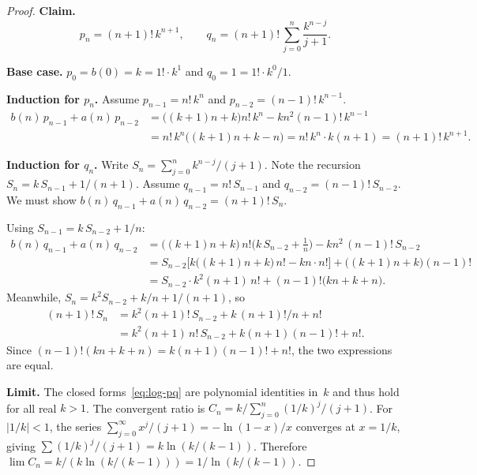 \documentclass[11pt,a4paper]{article}
\theoremstyle{plain}
\theoremstyle{remark}
\begin{document}
\begin{proof}
\textbf{Claim.}
\begin{equation}\label{eq:log-pq}
  p_n = (n{+}1)!\, k^{n+1}, \qquad
  q_n = (n{+}1)!\, \sum_{j=0}^{n} \frac{k^{n-j}}{j+1}.
\end{equation}

\textbf{Base case.}
$p_0 = b(0) = k = 1!\cdot k^1$ and $q_0 = 1 = 1!\cdot k^0/1$.

\medskip\noindent\textbf{Induction for $p_n$.}
Assume $p_{n-1} = n!\,k^n$ and $p_{n-2} = (n{-}1)!\,k^{n-1}$.
\begin{align*}
  b(n)\,p_{n-1} + a(n)\,p_{n-2}
  &= \bigl((k{+}1)n + k\bigr) n!\,k^n - kn^2 (n{-}1)!\,k^{n-1} \\
  &= n!\,k^n\bigl((k{+}1)n + k - n\bigr)
   = n!\,k^n \cdot k(n{+}1) = (n{+}1)!\,k^{n+1}.
\end{align*}

\medskip\noindent\textbf{Induction for $q_n$.}
Write $S_n = \sum_{j=0}^{n} k^{n-j}/(j{+}1)$.
Note the recursion $S_n = k\,S_{n-1} + 1/(n{+}1)$.
Assume $q_{n-1} = n!\,S_{n-1}$ and $q_{n-2} = (n{-}1)!\,S_{n-2}$.
We must show $b(n)\,q_{n-1} + a(n)\,q_{n-2} = (n{+}1)!\,S_n$.

Using $S_{n-1} = k\,S_{n-2} + 1/n$:
\begin{align*}
b(n)\,q_{n-1} + a(n)\,q_{n-2}
&= \bigl((k{+}1)n{+}k\bigr)\,n!\bigl(k\,S_{n-2}+\tfrac{1}{n}\bigr)
   - kn^2\,(n{-}1)!\,S_{n-2} \\
&= S_{n-2}\bigl[k\bigl((k{+}1)n{+}k\bigr)\,n! - kn\cdot n!\bigr]
   + \bigl((k{+}1)n{+}k\bigr)(n{-}1)! \\
&= S_{n-2}\cdot k^2(n{+}1)\,n!
   + (n{-}1)!\bigl(kn+k+n\bigr).
\end{align*}
Meanwhile, $S_n = k^2 S_{n-2} + k/n + 1/(n{+}1)$, so
\begin{align*}
(n{+}1)!\,S_n
&= k^2(n{+}1)!\,S_{n-2} + k\,(n{+}1)!/n + n! \\
&= k^2(n{+}1)\,n!\,S_{n-2} + k(n{+}1)(n{-}1)! + n!.
\end{align*}
Since $(n{-}1)!(kn{+}k{+}n) = k(n{+}1)(n{-}1)! + n!$,
the two expressions are equal.

\medskip\noindent\textbf{Limit.}
The closed forms~\eqref{eq:log-pq} are polynomial identities in~$k$
and thus hold for all real $k > 1$.
The convergent ratio is
$C_n = k/\sum_{j=0}^{n}(1/k)^j/(j{+}1)$.
For $|1/k| < 1$, the series
$\sum_{j=0}^{\infty} x^j/(j{+}1) = -\ln(1{-}x)/x$
converges at $x = 1/k$, giving
$\sum (1/k)^j/(j{+}1) = k\ln(k/(k{-}1))$.
Therefore
$\lim C_n = k/(k\ln(k/(k{-}1))) = 1/\ln(k/(k{-}1))$.
\end{proof}
\end{document}
